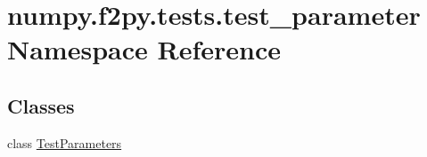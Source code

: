 \hypertarget{namespacenumpy_1_1f2py_1_1tests_1_1test__parameter}{}\section{numpy.\+f2py.\+tests.\+test\+\_\+parameter Namespace Reference}
\label{namespacenumpy_1_1f2py_1_1tests_1_1test__parameter}
\subsection*{Classes}
\begin{DoxyCompactItemize}
\item 
class \hyperlink{classnumpy_1_1f2py_1_1tests_1_1test__parameter_1_1TestParameters}{Test\+Parameters}
\end{DoxyCompactItemize}
